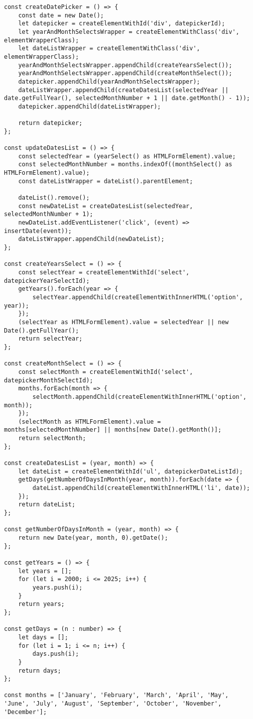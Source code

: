 \documentclass[a4paper,14pt]{extarticle}
\begin{document}
\begin{lstlisting}
const createDatePicker = () => {
    const date = new Date();
    let datepicker = createElementWithId('div', datepickerId);
    let yearAndMonthSelectsWrapper = createElementWithClass('div', elementWrapperClass);
    let dateListWrapper = createElementWithClass('div', elementWrapperClass);
    yearAndMonthSelectsWrapper.appendChild(createYearsSelect());
    yearAndMonthSelectsWrapper.appendChild(createMonthSelect());
    datepicker.appendChild(yearAndMonthSelectsWrapper);
    dateListWrapper.appendChild(createDatesList(selectedYear || date.getFullYear(), selectedMonthNumber + 1 || date.getMonth() - 1));
    datepicker.appendChild(dateListWrapper);

    return datepicker;
};

const updateDatesList = () => {
    const selectedYear = (yearSelect() as HTMLFormElement).value;
    const selectedMonthNumber = months.indexOf((monthSelect() as HTMLFormElement).value);
    const dateListWrapper = dateList().parentElement;

    dateList().remove();
    const newDateList = createDatesList(selectedYear, selectedMonthNumber + 1);
    newDateList.addEventListener('click', (event) => insertDate(event));
    dateListWrapper.appendChild(newDateList);
};

const createYearsSelect = () => {
    const selectYear = createElementWithId('select', datepickerYearSelectId);
    getYears().forEach(year => {
        selectYear.appendChild(createElementWithInnerHTML('option', year));
    });
    (selectYear as HTMLFormElement).value = selectedYear || new Date().getFullYear();
    return selectYear;
};

const createMonthSelect = () => {
    const selectMonth = createElementWithId('select', datepickerMonthSelectId);
    months.forEach(month => {
        selectMonth.appendChild(createElementWithInnerHTML('option', month));
    });
    (selectMonth as HTMLFormElement).value = months[selectedMonthNumber] || months[new Date().getMonth()];
    return selectMonth;
};

const createDatesList = (year, month) => {
    let dateList = createElementWithId('ul', datepickerDateListId);
    getDays(getNumberOfDaysInMonth(year, month)).forEach(date => {
        dateList.appendChild(createElementWithInnerHTML('li', date));
    });
    return dateList;
};

const getNumberOfDaysInMonth = (year, month) => {
    return new Date(year, month, 0).getDate();
};

const getYears = () => {
    let years = [];
    for (let i = 2000; i <= 2025; i++) {
        years.push(i);
    }
    return years;
};

const getDays = (n : number) => {
    let days = [];
    for (let i = 1; i <= n; i++) {
        days.push(i);
    }
    return days;
};

const months = ['January', 'February', 'March', 'April', 'May', 'June', 'July', 'August', 'September', 'October', 'November', 'December'];
\end{lstlisting}
\end{document}

